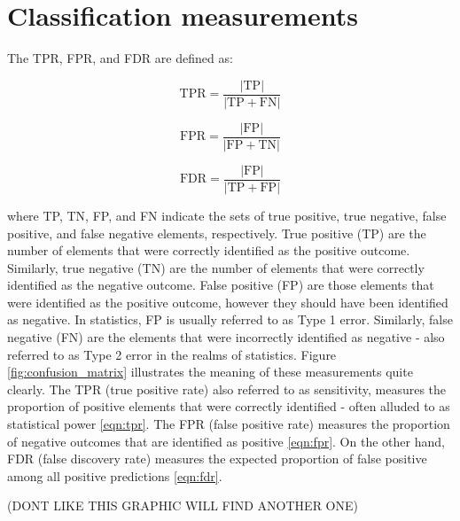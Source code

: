 \section{Classification measurements}
The TPR, FPR, and FDR are defined as:

\begin{equation}
\text{TPR}=\frac{|\text{TP}|}{|\text{TP}+\text{FN}|}
\label{eqn:tpr}
\end{equation}

\begin{equation}
\text{FPR}=\frac{|\text{FP}|}{|\text{FP}+\text{TN}|}
\label{eqn:fpr}
\end{equation}

\begin{equation}
\text{FDR}=\frac{|\text{FP}|}{|\text{TP}+\text{FP}|}
\label{eqn:fdr}
\end{equation}

where TP, TN, FP, and FN indicate the sets of true positive, true negative, false positive, and false negative elements, respectively. True positive (TP) are the number of elements that were correctly identified as the positive outcome. Similarly, true negative (TN) are the number of elements that were correctly identified as the negative outcome. False positive (FP) are those elements that were identified as the positive outcome, however they should have been identified as negative. In statistics, FP is usually referred to as Type 1 error. Similarly, false negative (FN) are the elements that were incorrectly identified as negative - also referred to as Type 2 error in the realms of statistics. Figure \ref{fig:confusion_matrix} illustrates the meaning of these measurements quite clearly. The TPR (true positive rate) also referred to as sensitivity, measures the proportion of positive elements that were correctly identified - often alluded to as statistical power \ref{eqn:tpr}. The FPR (false positive rate) measures the proportion of negative outcomes that are identified as positive \ref{eqn:fpr}. On the other hand, FDR (false discovery rate) measures the expected proportion of false positive among all positive predictions \ref{eqn:fdr}. 

(DONT LIKE THIS GRAPHIC WILL FIND ANOTHER ONE)

